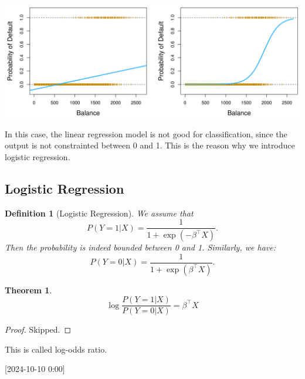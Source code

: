 \documentclass{article}
\theoremstyle{MyNonumberplain}
\theoremstyle{break}
\newtheorem*{proof}{Proof. }
\newcommand{\T}{^\intercal}
\theoremstyle{break}
\newtheorem{theorem}{Theorem}[section]
\theoremstyle{break}
\theoremstyle{break}
\newtheorem{definition}{Definition}[section]
\begin{document}
\begin{center}
    \includegraphics*[scale=0.2]{Images/img19.png}
\end{center}

In this case, the linear regression model is not good for classification, since the output is not constrainted between 0 and 1.
This is the reason why we introduce logistic regression.

\subsection{Logistic Regression}

\begin{defbox}
    \begin{definition}[Logistic Regression]
        We assume that 
        $$
        P(Y=1|X)=\frac{1}{1+\exp(-\beta\T X)}.
        $$
        Then the probability is indeed bounded between 0 and 1. Similarly, we have:
        $$
        P(Y=0|X)=\frac{1}{1+\exp(\beta\T X)}.
        $$        
    \end{definition}
\end{defbox}

\begin{thmbox}
    \begin{theorem}
        $$\log{\frac{P(Y=1|X)}{P(Y=0|X)}}=\beta\T X$$
    \end{theorem}
    \begin{prfbox}
        \begin{proof}
            Skipped.
        \end{proof}
    \end{prfbox}
\end{thmbox} 

This is called log-odds ratio.

[2024-10-10 0:00]
\end{document}
